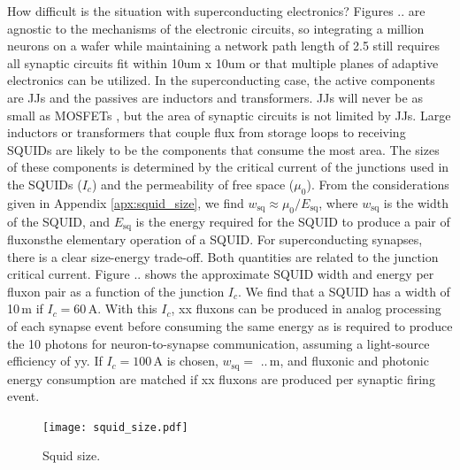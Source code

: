 \documentclass[twocolumn]{article}
\begin{document}
How difficult is the situation with superconducting electronics? Figures .. are agnostic to the mechanisms of the electronic circuits, so integrating a million neurons on a wafer while maintaining a network path length of 2.5 still requires all synaptic circuits fit within 10um x 10um or that multiple planes of adaptive electronics can be utilized. In the superconducting case, the active components are JJs and the passives are inductors and transformers. JJs will never be as small as MOSFETs \cite{tolpygo2016superconductor}, but the area of synaptic circuits is not limited by JJs. Large inductors or transformers that couple flux from storage loops to receiving SQUIDs are likely to be the components that consume the most area. The sizes of these components is determined by the critical current of the junctions used in the SQUIDs ($I_c$) and the permeability of free space ($\mu_0$). From the considerations given in Appendix \ref{apx:squid_size}, we find $w_{\mathrm{sq}} \approx \mu_0/E_{\mathrm{sq}}$, where $w_{\mathrm{sq}}$ is the width of the SQUID, and $E_{\mathrm{sq}}$ is the energy required for the SQUID to produce a pair of fluxons\textemdash the elementary operation of a SQUID. For superconducting synapses, there is a clear size-energy trade-off. Both quantities are related to the junction critical current. Figure .. shows the approximate SQUID width and energy per fluxon pair as a function of the junction $I_c$. We find that a SQUID has a width of 10\,\textmu m if $I_c = 60$\,\textmu A. With this $I_c$, xx fluxons can be produced in analog processing of each synapse event before consuming the same energy as is required to produce the 10 photons for neuron-to-synapse communication, assuming a light-source efficiency of yy. If $I_c = 100$\,\textmu A is chosen, $w_{\mathrm{sq}} = $ ..\,\textmu m, and fluxonic and photonic energy consumption are matched if xx fluxons are produced per synaptic firing event.
\begin{figure}
    \centering
    \texttt{[image: squid\_size.pdf]}
    \caption{Squid size.}
    \label{fig:squid_size}
\end{figure}
\end{document}
